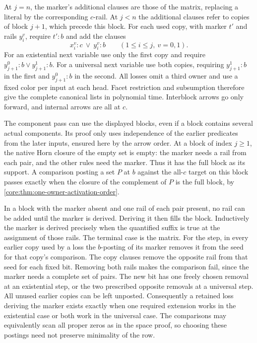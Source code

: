 At $j=n$, the marker's additional clauses are those of the
matrix, replacing a literal by the corresponding $c$-rail.
At $j<n$ the additional clauses refer to copies of block
$j+1$, which precede this block. For each used copy, with
marker $t'$ and rails $y_i^v$, require $t':b$ and add the
clauses
\[
             x_i^v:c\ \lor\ y_i^v:b
             \qquad(1\le i\le j,\ v=0,1).
\]
For an existential next variable use only the first copy
and require $y_{j+1}^0:b\lor y_{j+1}^1:b$. For a universal
next variable use both copies, requiring $y_{j+1}^1:b$ in
the first and $y_{j+1}^0:b$ in the second.
All losses omit a third owner and use a fixed color per
input at each head. Facet restriction and subsumption
therefore give the complete canonical lists in polynomial
time. Interblock arrows go only forward, and internal
arrows are all at $c$.

The component pass can use the displayed blocks, even if
a block contains several actual components. Its proof only
uses independence of the earlier predicates from the later
inputs, ensured here by the arrow order. At a block of index
$j\ge1$, the native Horn closure of the empty set is empty:
the marker needs a rail from each pair, and the other
rules need the marker. Thus it has the full block as its
support. A comparison posting a set $P$ at $b$ against the
all-$c$ target on this block passes exactly when the closure
of the complement of $P$ is the full block, by
\cref{core:thm:one-owner-activation-order}.

In a block with the marker absent and one rail of each
pair present, no rail can be added until the marker is
derived. Deriving it then fills the block. Inductively the
marker is derived precisely when the quantified suffix is
true at the assignment of those rails. The terminal case
is the matrix. For the step, in every earlier copy used
by a loss the $b$-posting of its marker removes it from
the seed for that copy's comparison. The copy clauses
remove the opposite rail from that seed for each fixed
bit. Removing both rails makes the comparison fail, since
the marker needs a complete set of pairs. The new bit
has one freely chosen removal at an existential step,
or the two prescribed opposite removals at a universal
step. All unused earlier copies can be left unposted.
Consequently a retained loss deriving the marker exists
exactly when one required extension works in the
existential case or both work in the universal case.
The comparisons may equivalently scan all proper zeros
as in the space proof, so choosing these postings need
not preserve minimality of the row.

